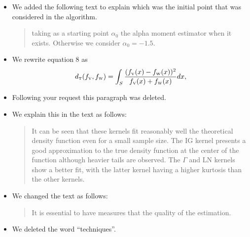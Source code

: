 \documentclass{ar2rc}
\begin{document}
\begin{itemize}
		\item We added the following text to explain which was the initial point that was considered in the algorithm.
		\begin{quote}
			taking as a starting point $\alpha_0$ the alpha moment estimator when it exists. Otherwise we consider $\alpha_0=-1.5$.
		\end{quote}
		\item We rewrite equation $8$ as 
		\begin{equation}
			d_{\text{\tiny{T}}}(f_{\text{\tiny{V}}},f_{\text{\tiny{W}}})=\int_{S}\frac{(f_{\text{\tiny{V}}}(x)-f_{\text{\tiny{W}}}(x))^2}{f_{\text{\tiny{V}}}(x)+f_{\text{\tiny{W}}}(x)}dx,
			\label{DT}
		\end{equation}
		
		\item Following your request this paragraph was deleted.
		\item We explain this in the text as follows:
		\begin{quote}
			It can be seen that these kernels fit reasonably well the theoretical density function even for a small sample size. The IG kernel presents a good approximation to the true density function at the center of the function although heavier tails are observed. The $\Gamma$ and LN kernels show a better fit, with the latter kernel having a higher kurtosis than the other kernels.
		\end{quote}
		\item We changed the text as follows:
		\begin{quote}		
			It is essential to have measures that \DIFdelbegin {} \DIFdelend \DIFaddbegin {}\DIFaddend the quality of the estimation. 
		\end{quote}
		\item We deleted the word ``techniques''.
	\end{itemize}
	
	
	
	
\end{document}
